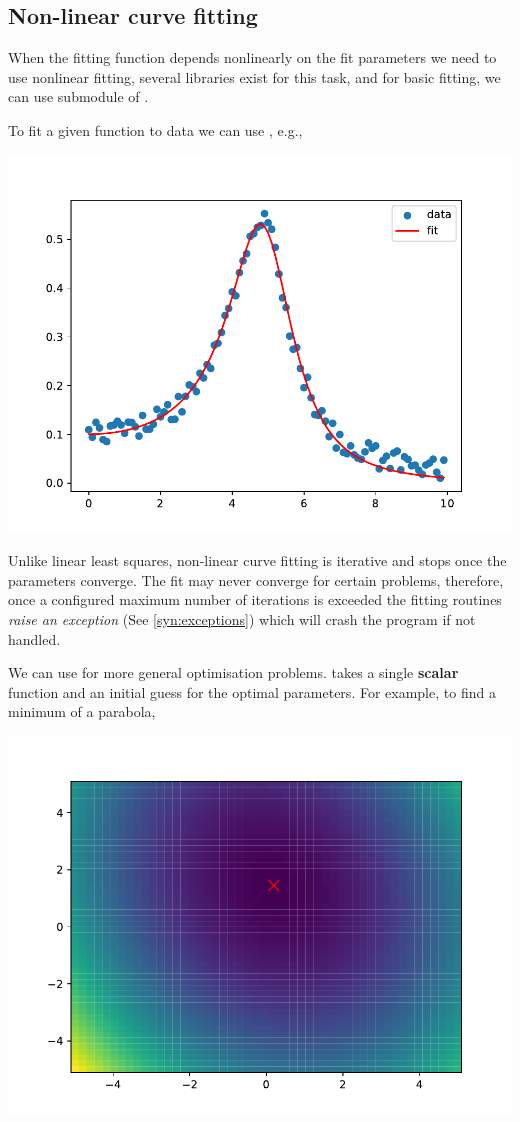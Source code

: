 \subsection{Non-linear curve fitting}
When the fitting function depends nonlinearly on the fit parameters we need to use nonlinear fitting, several libraries exist for this task, and for basic fitting, we can use  submodule of .

To fit a given function to data we can use , e.g.,

\begin{center}
    \includegraphics[width=0.5\linewidth]{curve_fit.pdf}
\end{center}

Unlike linear least squares, non-linear curve fitting is iterative and stops once the parameters converge. The fit may never converge for certain problems, therefore, once a configured maximum number of iterations is exceeded the fitting routines \emph{raise an exception} (See \ref{syn:exceptions}) which will crash the program if not handled.

We can use  for more general optimisation problems.  takes a single \textbf{scalar} function and an initial guess for the optimal parameters. For example, to find a minimum of a parabola,

\begin{center}
    \includegraphics[width=0.5\linewidth]{parabola-minimize.pdf}
\end{center}

